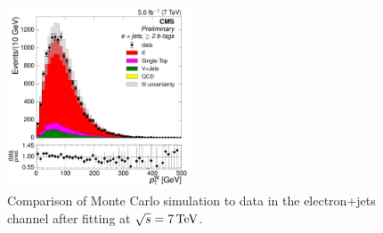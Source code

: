 \begin{figure}[hbtp]
	 \includegraphics[width=0.48\textwidth]{Chapters/04_Analysis/04b_XSections/images/control_plots/after_fit/7TeV/EPlusJets_patType1CorrectedPFMet_WPT_2orMoreBtags_with_ratio.pdf}\hfill
	 \caption{Comparison of Monte Carlo simulation to data in the electron+jets channel after fitting at
	 $\sqrt{s}=7\,\text{Te\hspace{-.08em}V}$.}
     \label{fig:data_mc_comparison_after_fit_7TeV_electron}
\end{figure}
 
